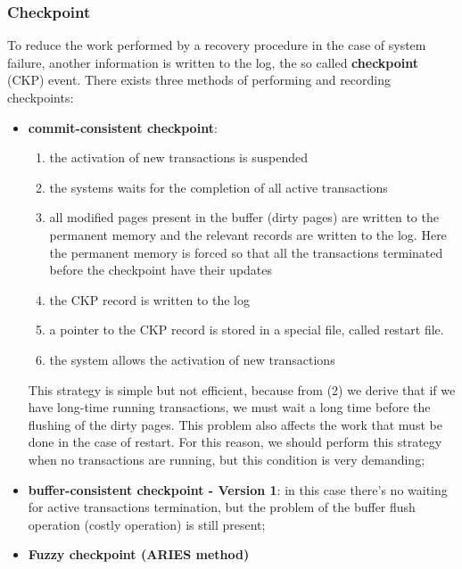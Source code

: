 \subsubsection{Checkpoint}
To reduce the work performed by a recovery procedure in the case of system failure, another information is written to the log, the so called \textbf{checkpoint} (CKP) event. There exists three methods of performing and recording checkpoints:

\begin{itemize}
    \item \textbf{commit-consistent checkpoint}:
    
    \begin{enumerate}
        \item the activation of new transactions is suspended 
        \item the systems waits for the completion of all active transactions
        \item all modified pages present in the buffer (dirty pages) are written to the permanent memory and the relevant records are written to the log. Here the permanent memory is forced so that all the transactions terminated before the checkpoint have their updates
        \item the CKP record is written to the log 
        \item a pointer to the CKP record is stored in a special file, called restart file.
        \item the system allows the activation of new transactions
        
    \end{enumerate}

    This strategy is simple but not efficient, because from (2) we derive that if we have long-time running transactions, we must wait a long time before the flushing of the dirty pages. This problem also affects the work that must be done in the case of restart. For this reason, we should perform this strategy when no transactions are running, but this condition is very demanding;

    \item \textbf{buffer-consistent checkpoint - Version 1}: in this case there's no waiting for active transactions termination, but the problem of the buffer flush operation (costly operation) is still present;

    \item \textbf{Fuzzy checkpoint (ARIES method)}

\end{itemize}

